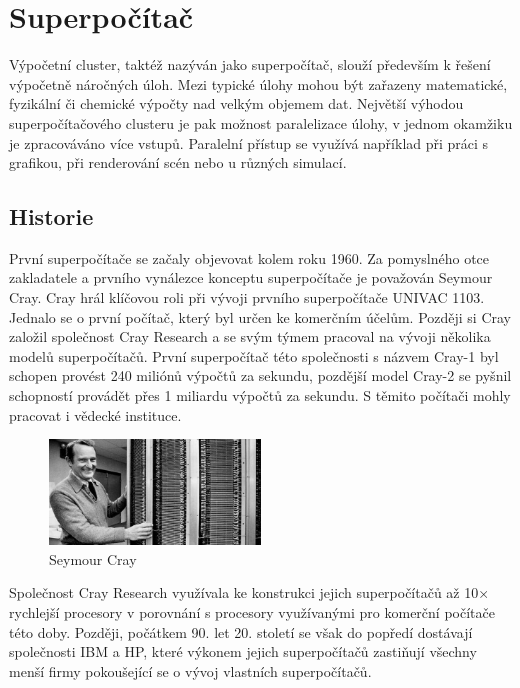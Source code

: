 \chapter{Superpočítač}
Výpočetní cluster, taktéž nazýván jako superpočítač, slouží především k řešení výpočetně náročných úloh. Mezi typické úlohy mohou být zařazeny matematické, fyzikální či chemické výpočty nad velkým objemem dat. Největší výhodou superpočítačového clusteru je pak možnost paralelizace úlohy, v jednom okamžiku je zpracováváno více vstupů. Paralelní přístup se využívá například při práci s grafikou, při renderování scén nebo u různých simulací.

\section{Historie}
První superpočítače se začaly objevovat kolem roku 1960. Za pomyslného otce zakladatele a prvního vynálezce konceptu superpočítače je považován Seymour Cray. Cray hrál klíčovou roli při vývoji prvního superpočítače UNIVAC 1103. Jednalo se o první počítač, který byl určen ke komerčním účelům. Později si Cray založil společnost Cray Research a se svým týmem pracoval na vývoji několika modelů superpočítačů. První superpočítač této společnosti s názvem Cray-1 byl schopen provést 240 miliónů výpočtů za sekundu, pozdější model Cray-2 se pyšnil schopností provádět přes 1 miliardu výpočtů za sekundu. S těmito počítači mohly pracovat i vědecké instituce. \cite{E1JpczXW0qh9e98N}

\begin{figure}
	\centering
	\includegraphics[width=0.5\textwidth]{Figures/seymour-cray.jpg}
	\caption{Seymour Cray \cite{Tronner20150626}}
	\label{fig:seymour-cray}
\end{figure}

Společnost Cray Research využívala ke konstrukci jejich superpočítačů až 10× rychlejší procesory v porovnání s procesory využívanými pro komerční počítače této doby. Později, počátkem 90. let 20. století se však do popředí dostávají společnosti IBM a HP, které výkonem jejich superpočítačů zastiňují všechny menší firmy pokoušející se o vývoj vlastních superpočítačů.

